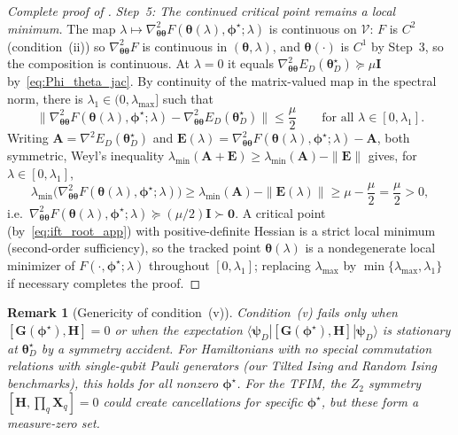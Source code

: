 \documentclass[11pt]{article}
\newcommand{\cV}{\mathcal{V}}
\theoremstyle{plain}
\theoremstyle{plain}
\newtheorem{remark}[theorem]{Remark}
\begin{document}
\begin{proof}[Complete proof of ]
\emph{Step~5: The continued critical point remains a local minimum.}
The map $\lambda\mapsto\nabla^2_{\bm\theta\bm\theta}
F(\bm\theta(\lambda),\bm\phi^\star;\lambda)$ is continuous on $\cV$:
$F$ is $C^2$ (condition~(ii)) so $\nabla^2_{\bm\theta\bm\theta}F$ is
continuous in $(\bm\theta,\lambda)$, and $\bm\theta(\cdot)$ is $C^1$ by
Step~3, so the composition is continuous.  At $\lambda=0$ it equals
$\nabla^2_{\bm\theta\bm\theta}E_D(\bm\theta_D^\star)\succeq\mu\mathbf{I}$
by~\eqref{eq:Phi_theta_jac}.  By continuity of the matrix-valued map in
the spectral norm, there is $\lambda_1\in(0,\lambda_{\max}]$ such that
\begin{equation}\label{eq:hess_close_app}
  \bigl\|\nabla^2_{\bm\theta\bm\theta}
    F(\bm\theta(\lambda),\bm\phi^\star;\lambda)
    -\nabla^2_{\bm\theta\bm\theta}E_D(\bm\theta_D^\star)\bigr\|
  \le\frac{\mu}{2}
  \qquad\text{for all }\lambda\in[0,\lambda_1].
\end{equation}
Writing $\mathbf{A}=\nabla^2 E_D(\bm\theta_D^\star)$ and $\mathbf{E}(\lambda)=
\nabla^2_{\bm\theta\bm\theta}F(\bm\theta(\lambda),\bm\phi^\star;\lambda)-\mathbf{A}$,
both symmetric, Weyl's inequality
$\lambda_{\min}(\mathbf{A}+\mathbf{E})\ge\lambda_{\min}(\mathbf{A})-\|\mathbf{E}\|$ gives, for
$\lambda\in[0,\lambda_1]$,
\begin{equation}\label{eq:weyl_app}
  \lambda_{\min}\bigl(\nabla^2_{\bm\theta\bm\theta}
    F(\bm\theta(\lambda),\bm\phi^\star;\lambda)\bigr)
  \ge\lambda_{\min}(\mathbf{A})-\|\mathbf{E}(\lambda)\|
  \ge\mu-\frac{\mu}{2}=\frac{\mu}{2}>0 ,
\end{equation}
i.e.\ $\nabla^2_{\bm\theta\bm\theta}F(\bm\theta(\lambda),\bm\phi^\star;\lambda)
\succeq(\mu/2)\mathbf{I}\succ\mathbf 0$.  A critical point
(by~\eqref{eq:ift_root_app}) with positive-definite Hessian is a
strict local minimum (second-order sufficiency), so the tracked point
$\bm\theta(\lambda)$ is a nondegenerate local minimizer of
$F(\cdot,\bm\phi^\star;\lambda)$ throughout $[0,\lambda_1]$; replacing
$\lambda_{\max}$ by $\min\{\lambda_{\max},\lambda_1\}$ if necessary
completes the proof.
\end{proof}
\begin{remark}[Genericity of condition~(v)]
\label{rem:nontrivial_genericity_app}
  Condition~(v) fails only when $[\mathbf{G}(\bm\phi^\star),\mathbf{H}]=0$ or when the
  expectation $\langle\boldsymbol{\psi}_D|[\mathbf{G}(\bm\phi^\star),\mathbf{H}]|\boldsymbol{\psi}_D\rangle$ is
  stationary at $\bm\theta_D^\star$ by a symmetry accident.  For
  Hamiltonians with no special commutation relations with single-qubit
  Pauli generators (our Tilted Ising and Random Ising benchmarks),
  this holds for all nonzero $\bm\phi^\star$.  For the TFIM, the
  $Z_2$ symmetry $[\mathbf{H},\prod_q \mathbf{X}_q]=0$ could create cancellations for
  specific $\bm\phi^\star$, but these form a measure-zero set.
\end{remark}
\end{document}
